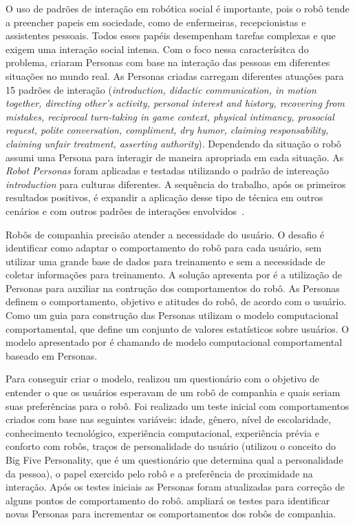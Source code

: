 O uso de padrões de interação em robótica social é importante, pois o robô tende a preencher papeis em sociedade, como de enfermeiras, recepcionistas e assistentes pessoais. Todos esses papéis desempenham tarefas complexas e que exigem uma interação social intensa. Com o foco nessa caracterísitca do problema, \textcite{ruckert:2013} criaram Personas com base na interação das pessoas em diferentes situações no mundo real. As Personas criadas carregam diferentes atuações para 15 padrões de interação (\emph{introduction, didactic communication, in motion together, directing other's activity, personal interest and history, recovering from mistakes, reciprocal turn-taking in game context, physical intimancy, prosocial request, polite conversation, compliment, dry humor, claiming responsability, claiming unfair treatment, asserting authority}). Dependendo da situação o robô assumi uma Persona para interagir de maneira apropriada em cada situação. As \emph{Robot Personas} foram aplicadas e testadas utilizando o padrão de intereação \emph{introduction} para culturas diferentes. A sequência do trabalho, após os primeiros resultados positivos, é expandir a aplicação desse tipo de técnica em outros cenários e com outros padrões de interações envolvidos~\cite{ruckert:2013}.

Robôs de companhia precisão atender a necessidade do usuário. O desafio é identificar como adaptar o comportamento do robô para cada usuário, sem utilizar uma grande base de dados para treinamento e sem a necessidade de coletar informações para treinamento. A solução apresenta por \textcite{duque:2013} é a utilização de Personas para auxiliar na contrução dos comportamentos do robô. As Personas definem o comportamento, objetivo e atitudes do robô, de acordo com o usuário. Como um guia para construção das Personas utilizam o modelo computacional comportamental, que define um conjunto de valores estatísticos sobre usuários. O modelo apresentado por \textcite{duque:2013} é chamando de modelo computacional comportamental baseado em Personas.

Para conseguir criar o modelo, \textcite{duque:2013} realizou um questionário com o objetivo de entender o que os usuários esperavam de um robô de companhia e quais seriam suas preferências para o robô. Foi realizado um teste inicial com comportamentos criados com base nas seguintes variáveis: idade, gênero, nível de escolaridade, conhecimento tecnológico, experiência computacional, experiência prévia e conforto com robôs, traços de personalidade do usuário (utilizou o conceito do Big Five Personality, que é um questionário que determina qual a personalidade da pessoa), o papel exercido pelo robô e a preferência de proximidade na interação. Após os testes iniciais as Personas foram atualizadas para correção de alguns pontos de comportamento do robô. \textcite{duque:2013} ampliará os testes para identificar novas Personas para incrementar os comportamentos dos robôs de companhia.

